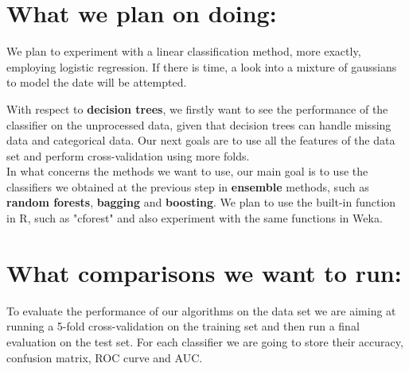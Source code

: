 \documentclass[a4paper,11pt]{article}
\begin{document}
\section{What we plan on doing:}

We plan to experiment with a linear classification method, more exactly, employing logistic regression. If there is time, a look into a mixture of gaussians to model the date will be attempted. 

With respect to \textbf{decision trees}, we firstly want to see the performance of the classifier on the unprocessed data, given that decision trees can handle missing data and categorical data. Our next goals are to  use all the features of the data set and perform cross-validation using more folds. \\

In what concerns the methods we want to use, our main goal is to use the classifiers we obtained at the previous step in \textbf{ensemble} methods, such as \textbf{random forests}, \textbf{bagging} and \textbf{boosting}. We plan to use the built-in function in R, such as "cforest" and also experiment with the same functions in Weka.

\section{What comparisons we want to run:}

To evaluate the performance of our algorithms on the data set we are aiming at running a  5-fold cross-validation on the training set and then run a final evaluation on the test set. For each classifier we are going to store their accuracy, confusion matrix, ROC curve and AUC.
\end{document}
